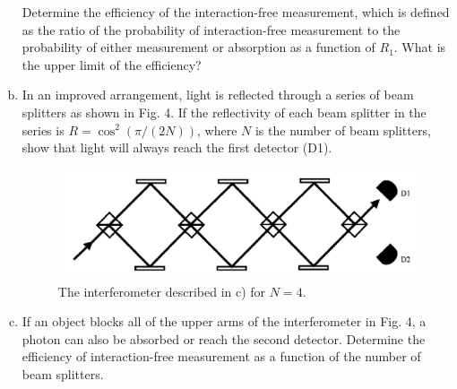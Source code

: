 \documentclass[a4paper,11pt]{article}
\begin{document}
\begin{enumerate}[a)]
Determine the efficiency of the interaction-free measurement, which is defined
as the ratio of the probability of interaction-free measurement to the
probability of either measurement or absorption as a function of $R_1$. What is
the upper limit of the efficiency?

\item In an improved arrangement, light is reflected through a series of beam
splitters as shown in Fig. 4. If the reflectivity of each beam splitter in the
series is $R=\cos^2(\pi/(2N))$, where $N$ is the number of beam splitters, show
that light will always reach the first detector (D1).

\begin{figure}[h!]
\centering
\includegraphics[scale=0.35]{images/ifm3.png}
\caption{The interferometer described in c) for $N=4$.}
\end{figure}

\item If an object blocks all of the upper arms of the interferometer in Fig. 4, a photon
can also be absorbed or reach the second detector. Determine the efficiency of
interaction-free measurement as a function of the number of beam splitters.
\end{enumerate}
\end{document}
